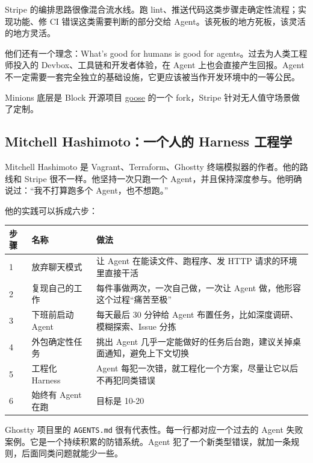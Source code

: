 \documentclass[10pt,a4paper]{ctexart}
\begin{document}
Stripe 的编排思路很像混合流水线。跑 lint、推送代码这类步骤走确定性流程；实现功能、修 CI 错误这类需要判断的部分交给 Agent。该死板的地方死板，该灵活的地方灵活。



他们还有一个理念：What's good for humans is good for agents。过去为人类工程师投入的 Devbox、工具链和开发者体验，在 Agent 上也会直接产生回报。Agent 不一定需要一套完全独立的基础设施，它更应该被当作开发环境中的一等公民。



Minions 底层是 Block 开源项目 \href{https://github.com/block/goose}{goose} 的一个 fork，Stripe 针对无人值守场景做了定制。



\subsection{Mitchell Hashimoto：一个人的 Harness 工程学}


Mitchell Hashimoto 是 Vagrant、Terraform、Ghostty 终端模拟器的作者。他的路线和 Stripe 很不一样。他坚持一次只跑一个 Agent，并且保持深度参与。他明确说过：“我不打算跑多个 Agent，也不想跑。”



他的实践可以拆成六步：


{\footnotesize
\begin{tabularx}{\textwidth}{|X|X|X|}
\hline
\textbf{步骤} & \textbf{名称} & \textbf{做法} \\
\hline
1 & 放弃聊天模式 & 让 Agent 在能读文件、跑程序、发 HTTP 请求的环境里直接干活 \\
\hline
2 & 复现自己的工作 & 每件事做两次，一次自己做，一次让 Agent 做，他形容这个过程“痛苦至极” \\
\hline
3 & 下班前启动 Agent & 每天最后 30 分钟给 Agent 布置任务，比如深度调研、模糊探索、Issue 分拣 \\
\hline
4 & 外包确定性任务 & 挑出 Agent 几乎一定能做好的任务后台跑，建议关掉桌面通知，避免上下文切换 \\
\hline
5 & 工程化 Harness & Agent 每犯一次错，就工程化一个方案，尽量让它以后不再犯同类错误 \\
\hline
6 & 始终有 Agent 在跑 & 目标是 10-20\\%
\hline
\end{tabularx}
}



Ghostty 项目里的 \texttt{AGENTS.md} 很有代表性。每一行都对应一个过去的 Agent 失败案例。它是一个持续积累的防错系统。Agent 犯了一个新类型错误，就加一条规则，后面同类问题就能少一些。
\end{document}
